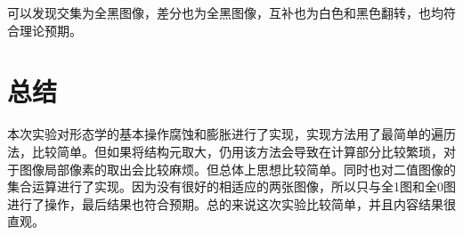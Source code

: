 \documentclass[12pt]{article}
\begin{document}
可以发现交集为全黑图像，差分也为全黑图像，互补也为白色和黑色翻转，也均符合理论预期。
\section{总结}
本次实验对形态学的基本操作腐蚀和膨胀进行了实现，实现方法用了最简单的遍历法，比较简单。但如果将结构元取大，仍用该方法会导致在计算部分比较繁琐，对于图像局部像素的取出会比较麻烦。但总体上思想比较简单。同时也对二值图像的集合运算进行了实现。因为没有很好的相适应的两张图像，所以只与全1图和全0图进行了操作，最后结果也符合预期。总的来说这次实验比较简单，并且内容结果很直观。
\end{document}
